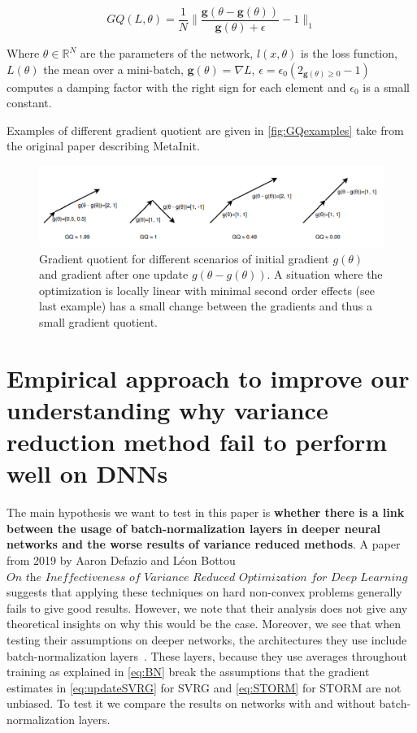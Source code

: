 \documentclass[a4paper,11pt,oneside]{report}
\begin{document}
\begin{equation}\label{eq:GQ}
    GQ(L,\theta) = \frac{1}{N}\biggl\lVert\frac{\textbf{g}(\theta-\textbf{g}(\theta))}{\textbf{g}(\theta)+\epsilon}-1 \biggr\rVert_1
\end{equation}

Where $\theta \in \mathbb{R}^N$ are the parameters of the network, $l(x, \theta)$ is the loss function, $L(\theta)$ the mean over a mini-batch, $\textbf{g}(\theta) = \nabla L$, $\epsilon = \epsilon_0(2_{\textbf{g}(\theta)\geq 0}-1)$ computes a damping factor with the right sign for each element and $\epsilon_0$ is a small constant.

Examples of different gradient quotient are given in \autoref{fig:GQexamples} take from the original paper describing MetaInit.

\begin{figure}
    \centering
    \includegraphics{figures/MetaInit.png}
    \caption{Gradient quotient for different scenarios of initial gradient $g(\theta)$ and gradient after one update $g(\theta - g(\theta))$. A situation where the optimization is locally linear with minimal second order effects (see last example) has a small change between the gradients and thus a small gradient quotient.}
    \label{fig:GQexamples}
\end{figure}

\chapter{Empirical approach to improve our understanding  why variance reduction method fail to  perform well on DNNs}

The main hypothesis we want to test in this paper is \textbf{whether there is a link between the usage of batch-normalization layers in deeper neural networks and the worse results of variance reduced methods}.
A paper from 2019 by Aaron Defazio and Léon Bottou $\textit{On the Ineffectiveness of Variance Reduced Optimization for Deep Learning}$ suggests that applying these techniques on hard non-convex problems generally fails to give good results. However, we note that their analysis does not give any theoretical insights on why this would be the case. Moreover, we see that when testing their assumptions on deeper networks, the architectures they use include batch-normalization layers~\cite{ioffe2015batch}. These layers, because they use averages throughout training as explained in \autoref{eq:BN} break the assumptions that the gradient estimates in \autoref{eq:updateSVRG} for SVRG and \autoref{eq:STORM} for STORM are not unbiased. To test it we compare the results on networks with and without batch-normalization layers.
\end{document}
